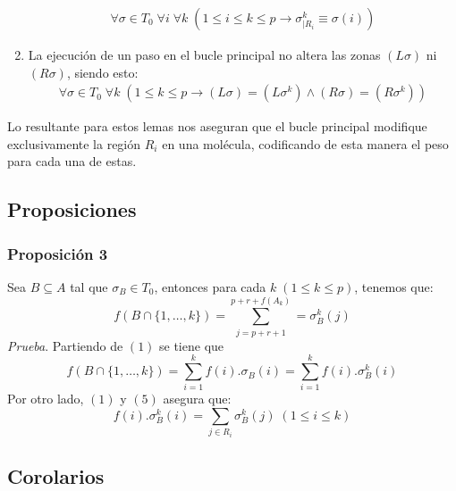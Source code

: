 \documentclass[12pt, letterpaper, twoside]{article}
\begin{document}
\begin{enumerate}
        \begin{equation}
            \begin{aligned}
                \forall\sigma\in{T_0}\;\forall{i}\;\forall{k}\;(1\leq{i}\leq{k}\leq{p}\rightarrow\sigma^{k}_{|R_i}\equiv\sigma(i))
            \end{aligned}
        \end{equation}
        \item La ejecución de un paso en el bucle principal no altera las zonas $(L\sigma)$ ni $(R\sigma)$, siendo esto:
        \begin{equation}
            \begin{aligned}
                \forall\sigma\in{T_0}\;\forall{k}\;(1\leq{k}\leq{p}\rightarrow(L\sigma)=(L\sigma^{k})\land(R\sigma)=(R\sigma^{k}))
            \end{aligned}
        \end{equation}
    \end{enumerate}

    Lo resultante para estos lemas nos aseguran que el bucle principal modifique exclusivamente la región $R_i$ en una molécula, codificando de esta manera el peso para cada una de estas.

    \subsection{Proposiciones}
    \subsubsection{Proposición 3}
    Sea $B\subseteq{A}$ tal que $\sigma_{B}\in{T_0}$, entonces para cada $k\;(1\leq{k}\leq{p})$, tenemos que:
    \begin{equation*}
        f(B\cap{\{1,\dots,k\}})=\sum^{p+r+f(A_k)}_{j=p+r+1}=\sigma^{k}_{B}(j)
    \end{equation*}
    \emph{Prueba}. Partiendo de $(1)$ se tiene que
    \begin{equation*}
        f(B\cap{\{1,\dots,{k}\}})=\sum^{k}_{i=1}f(i).\sigma_{B}(i)=\sum^{k}_{i=1}f(i).\sigma^{k}_{B}(i)
    \end{equation*}
    Por otro lado, $(1)$ y $(5)$ asegura que:
    \begin{equation*}
        f(i).\sigma^{k}_{B}(i)=\sum_{j\in{R_{i}}}\sigma^{k}_{B}(j)\;(1\leq{i}\leq{k})
    \end{equation*}
    \subsection{Corolarios}
\end{document}
